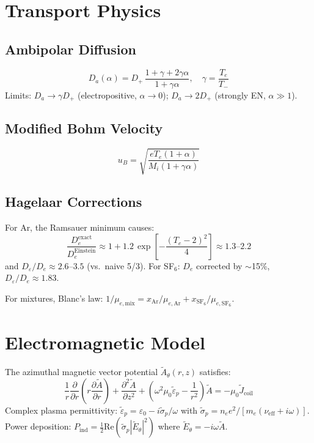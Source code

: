 \documentclass[11pt,a4paper]{article}
\renewcommand{\ne}{n_e}
\newcommand{\Te}{T_e}
\newcommand{\Da}{D_a}
\newcommand{\uB}{u_B}
\newcommand{\SFsix}{\mathrm{SF}_6}
\newcommand{\Ar}{\mathrm{Ar}}
\begin{document}
\section{Transport Physics}
\label{sec:transport}

\subsection{Ambipolar Diffusion}
\begin{equation}
\Da(\alpha) = D_+\,\frac{1+\gamma+2\gamma\alpha}{1+\gamma\alpha}, \quad \gamma = \frac{\Te}{T_-}
\end{equation}
Limits: $\Da \to \gamma D_+$ (electropositive, $\alpha \to 0$); $\Da \to 2D_+$ (strongly EN, $\alpha \gg 1$).

\subsection{Modified Bohm Velocity}
\begin{equation}
\uB = \sqrt{\frac{e\Te(1+\alpha)}{M_i(1+\gamma\alpha)}}
\end{equation}

\subsection{Hagelaar Corrections}

For Ar, the Ramsauer minimum causes:
\begin{equation}
\frac{D_e^{\mathrm{exact}}}{D_e^{\mathrm{Einstein}}} \approx 1 + 1.2\,\exp\!\left[-\frac{(\Te-2)^2}{4}\right] \approx 1.3\text{--}2.2
\end{equation}
and $D_\varepsilon/D_e \approx 2.6$--$3.5$ (vs.\ naive 5/3).  For SF$_6$: $D_e$ corrected by $\sim$15\%, $D_\varepsilon/D_e \approx 1.83$.

For mixtures, Blanc's law: $1/\mu_{e,\mathrm{mix}} = x_{\Ar}/\mu_{e,\Ar} + x_{\SFsix}/\mu_{e,\SFsix}$.

\section{Electromagnetic Model}
\label{sec:em}

The azimuthal magnetic vector potential $\tilde{A}_\theta(r,z)$ satisfies:
\begin{equation}
\frac{1}{r}\frac{\partial}{\partial r}\!\left(r\frac{\partial\tilde{A}}{\partial r}\right)+\frac{\partial^2\tilde{A}}{\partial z^2}+\left(\omega^2\mu_0\tilde{\varepsilon}_p-\frac{1}{r^2}\right)\!\tilde{A}=-\mu_0\tilde{J}_{\mathrm{coil}}
\end{equation}
Complex plasma permittivity: $\tilde{\varepsilon}_p = \varepsilon_0 - i\tilde{\sigma}_p/\omega$ with $\tilde{\sigma}_p = \ne e^2/[m_e(\nu_{\mathrm{eff}}+i\omega)]$.  Power deposition: $P_{\mathrm{ind}} = \frac{1}{2}\mathrm{Re}(\tilde{\sigma}_p|\tilde{E}_\theta|^2)$ where $\tilde{E}_\theta = -i\omega\tilde{A}$.
\end{document}
